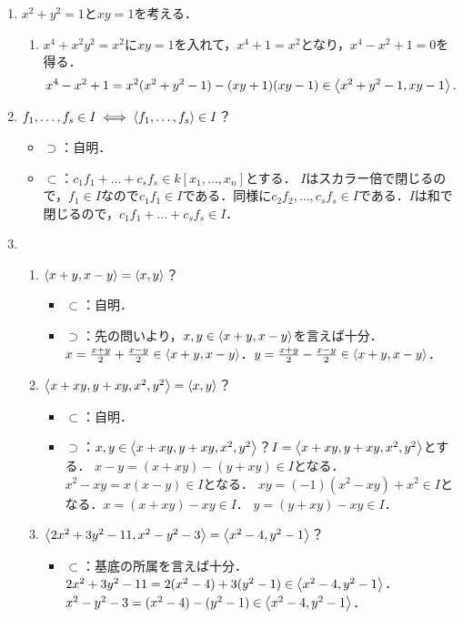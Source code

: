 \documentclass[9pt]{ltjsarticle}
\begin{document}
\begin{enumerate}[label=(問題\arabic*)]
 \item $x^2+y^2=1$と$xy=1$を考える．
\begin{enumerate}[label=(\alph*)]
 \item $x^4+x^2y^2=x^2$に$xy=1$を入れて，$x^4+1=x^2$となり，$x^4-x^2+1=0$を得る．
\begin{align}
 x^4-x^2+1
=
x^2(x^2+y^2-1) - (xy+1)(xy-1) \in \left\langle x^2+y^2-1,xy-1 \right\rangle.
\end{align}
\end{enumerate}
 \item $f_1,\dots,f_s \in I \iff \left\langle f_1,\dots,f_s \right\rangle\in I$？
\begin{itemize}
 \item $\supset$：自明．
 \item $\subset$：$c_1 f_1 + \dots + c_s f_s \in k[x_1,\dots,x_n]$とする．
$I$はスカラー倍で閉じるので，$f_1\in I$なので$c_1 f_1 \in I$である．同様に$c_2 f_2,\dots,c_s f_s \in I$である．$I$は和で閉じるので，$c_1 f_1 + \dots + c_s f_s \in I$．
\end{itemize}
 \item
\begin{enumerate}[label=(\alph*)]
 \item $\left\langle x+y,x-y \right\rangle = \left\langle x,y \right\rangle$？
\begin{itemize}
 \item $\subset$：自明．
 \item $\supset$：先の問いより，$x,y\in \left\langle x+y,x-y \right\rangle$を言えば十分．$x = \frac{x+y}{2} + \frac{x-y}{2}  \in \left\langle x+y,x-y \right\rangle$．$y=\frac{x+y}{2}-\frac{x-y}{2} \in \left\langle x+y,x-y \right\rangle$．
\end{itemize}
 \item $\left\langle x+xy,y+xy,x^2,y^2 \right\rangle=\left\langle x,y \right\rangle$？
\begin{itemize}
 \item $\subset$：自明．
 \item $\supset$：$x,y \in \left\langle x+xy,y+xy,x^2,y^2 \right\rangle$？$I=\left\langle x+xy,y+xy,x^2,y^2 \right\rangle$とする．
$x-y =(x+xy)-(y+xy) \in I$となる．$x^2 - xy = x(x-y)\in I$となる．
$xy = (-1)(x^2-xy) + x^2 \in I$となる．$x = (x+xy)-xy \in I$．
$y = (y+xy)-xy \in I$．
\end{itemize}
 \item $\left\langle 2x^2+3y^2-11,x^2-y^2-3 \right\rangle=\left\langle x^2-4,y^2-1 \right\rangle$？
\begin{itemize}
 \item $\subset$：基底の所属を言えば十分．$2x^2+3y^2-11 = 2(x^2-4) + 3(y^2-1) \in \left\langle x^2-4,y^2-1 \right\rangle$．
$x^2-y^2-3 = (x^2-4) - (y^2-1) \in \left\langle x^2-4,y^2-1 \right\rangle$．

\end{itemize}
\end{enumerate}
\end{enumerate}
\end{document}
